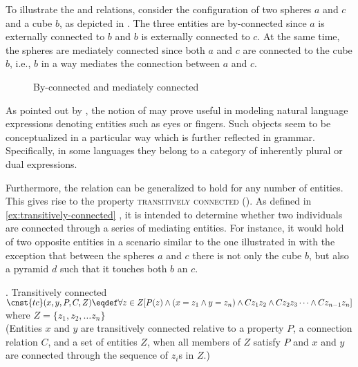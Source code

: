 \pagebreak To illustrate the  and  relations, consider the configuration of two spheres $a$ and $c$ and a cube $b$, as depicted in  . The three entities are by-connected since $a$ is externally connected to $b$ and $b$ is externally connected to $c$. At the same time, the spheres are mediately connected since both $a$ and $c$ are connected to the cube $b$, i.e., $b$ in a way mediates the connection between $a$ and $c$.

\begin{figure}[h!]
\centering
{}
\caption{By-connected and mediately connected}
\label{fig:by-connected-and-mediately-connected}
\end{figure}

As pointed out by \citet[pp. 134--135]{grimm2012number}, the notion of  may prove useful in modeling natural language expressions denoting entities such as eyes or fingers. Such objects seem to be conceptualized in a particular way which is further reflected in grammar. Specifically, in some languages they belong to a category of inherently plural or dual expressions.

Furthermore, the  relation can be generalized to hold for any number of entities. This gives rise to the property \textsc{transitively connected} (). As defined in \ref{ex:transitively-connected} \citep[see][p. 144]{grimm2012degrees,grimm2012number}, it is intended to determine whether two individuals are connected through a series of mediating entities. For instance, it would hold of two opposite entities in a scenario similar to the one illustrated in   with the exception that between the spheres $a$ and $c$ there is not only the cube $b$, but also a pyramid $d$ such that it touches both $b$ an $c$.

\ex. Transitively connected \citep[p. 15; adapted]{grimm2012degrees}\label{ex:transitively-connected}\\
$\cnst{tc}(x,y,P,C,Z) \eqdef \forall z \in Z[P(z) \wedge (x = z_1 \wedge y = z_n) \wedge Cz_1z_2 \wedge Cz_2z_3 \dots \wedge Cz_{n-1}z_n]$\\
where $Z = \{z_1,z_2,\dots z_n\}$\\
(Entities $x$ and $y$ are transitively connected relative to a property $P$, a connection relation $C$, and a set of entities $Z$, when all members of $Z$ satisfy $P$ and $x$ and $y$ are connected through the sequence of $z_i$s in $Z$.)

